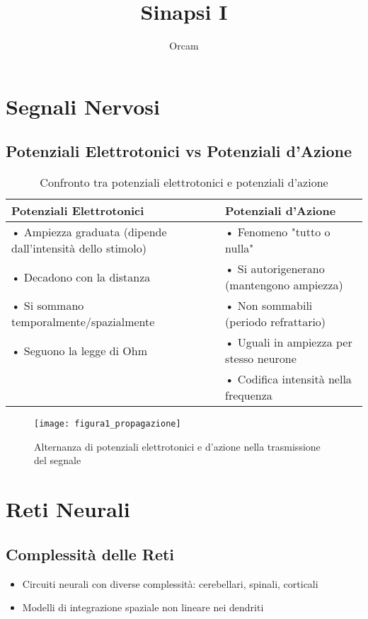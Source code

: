 \documentclass{article}
\title{Sinapsi I}
\author{Orcam}
\date{}
\begin{document}
\maketitle

\section{Segnali Nervosi}
\subsection{Potenziali Elettrotonici vs Potenziali d'Azione}
\begin{table}[h]
\centering
\caption{Confronto tra potenziali elettrotonici e potenziali d'azione}
\begin{tabular}{p{6cm}p{6cm}}
\toprule
\textbf{Potenziali Elettrotonici} & \textbf{Potenziali d'Azione} \\
\midrule
• Ampiezza graduata (dipende dall'intensità dello stimolo) & • Fenomeno "tutto o nulla" \\
• Decadono con la distanza & • Si autorigenerano (mantengono ampiezza) \\
• Si sommano temporalmente/spazialmente & • Non sommabili (periodo refrattario) \\
• Seguono la legge di Ohm & • Uguali in ampiezza per stesso neurone \\
& • Codifica intensità nella frequenza \\
\bottomrule
\end{tabular}
\label{tab:potenziali}
\end{table}

\begin{figure}[h]
\centering
\texttt{[image: figura1\_propagazione]}
\caption{Alternanza di potenziali elettrotonici e d'azione nella trasmissione del segnale}
\label{fig:propagazione}
\end{figure}

\section{Reti Neurali}
\subsection{Complessità delle Reti}
\begin{itemize}
\item Circuiti neurali con diverse complessità: cerebellari, spinali, corticali
\item Modelli di integrazione spaziale non lineare nei dendriti
\end{itemize}
\end{document}
